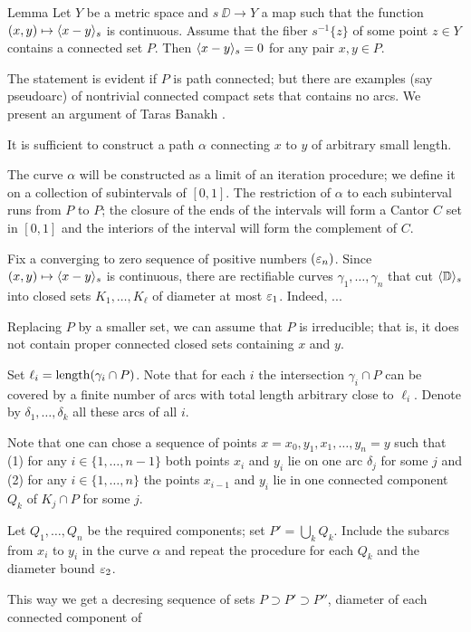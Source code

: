 \begin{thm}{Lemma}
Let $Y$ be a metric space and $s\:\DD\to Y$ a map such that the function $(x,y)\mapsto\langle x-y\rangle_{s}$ is continuous.
Assume that the fiber $s^{-1}\{z\}$ of some point $z\in Y$ contains a connected set $P$.
Then $\langle x-y\rangle_{s}=0$ for any pair $x,y\in P$.
\end{thm}


The statement is evident if $P$ is path connected; 
but there are examples (say pseudoarc) of nontrivial connected compact sets that contains no arcs.
We present an argument of Taras Banakh \cite{banakh}.

It is sufficient to construct a path $\alpha$ connecting $x$ to $y$ of arbitrary small length.

The curve $\alpha$ will be constructed as a limit of an iteration procedure;
we define it on a collection of subintervals of $[0,1]$.
The restriction of $\alpha$ to each subinterval runs from $P$ to $P$;
the closure of the ends of the intervals will form a Cantor $C$ set in $[0,1]$ and the interiors of the interval will form the complement of $C$.

Fix a converging to zero sequence of positive numbers $(\varepsilon_n)$. 
Since $(x,y)\zz\mapsto\<x-y\>_{s}$ is continuous, 
there are rectifiable curves $\gamma_1,\dots,\gamma_n$ that cut $\langle\mathbb{D}\rangle_s$ into closed sets $K_1,\dots,K_\ell$ of diameter at most $\varepsilon_1$.
Indeed, ...

Replacing $P$ by a smaller set, we can assume that $P$ is irreducible; that is, it does not contain proper connected closed sets containing $x$ and $y$.

Set $\ell_i=\mathop{\rm length}\nolimits(\gamma_i\cap P)$.
Note that for each $i$ the intersection $\gamma_i\cap P$ can be covered by a finite number of arcs with total length arbitrary close to $\ell_i$.
Denote by $\delta_1,\dots,\delta_k$ all these arcs of all $i$.

Note that one can chose a sequence of points $x=x_0,y_1,x_1,\dots,y_n=y$
such that 
(1) for any $i\in\{1,\dots,n-1\}$ both points $x_i$ and $y_i$ lie on one arc $\delta_j$ for some $j$ 
and 
(2) for any $i\in\{1,\dots,n\}$ the points $x_{i-1}$ and $y_i$ lie in one connected component $Q_k$ of $K_j\cap P$ for some $j$.

Let  $Q_1, \dots, Q_n$ be the required components; 
set $P'=\bigcup_k Q_k$. 
Include the subarcs from $x_i$ to $y_i$ in the curve $\alpha$ and repeat the procedure for each $Q_k$ and the diameter bound $\varepsilon_2$.

This way we get a decresing sequence of sets $P\supset P'\supset P''$,
diameter of each connected component of 


